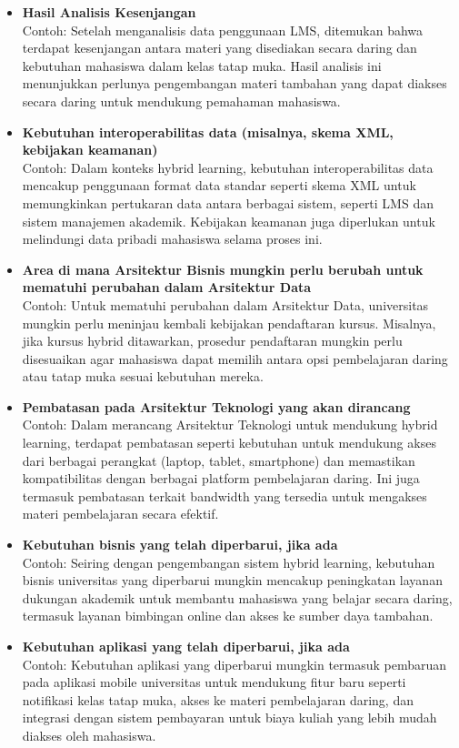 \begin{itemize}
	\item \textbf{Hasil Analisis Kesenjangan} \\
	Contoh: Setelah menganalisis data penggunaan LMS, ditemukan bahwa terdapat kesenjangan antara materi yang disediakan secara daring dan kebutuhan mahasiswa dalam kelas tatap muka. Hasil analisis ini menunjukkan perlunya pengembangan materi tambahan yang dapat diakses secara daring untuk mendukung pemahaman mahasiswa.
	
	\item \textbf{Kebutuhan interoperabilitas data (misalnya, skema XML, kebijakan keamanan)} \\
	Contoh: Dalam konteks hybrid learning, kebutuhan interoperabilitas data mencakup penggunaan format data standar seperti skema XML untuk memungkinkan pertukaran data antara berbagai sistem, seperti LMS dan sistem manajemen akademik. Kebijakan keamanan juga diperlukan untuk melindungi data pribadi mahasiswa selama proses ini.
	
	\item \textbf{Area di mana Arsitektur Bisnis mungkin perlu berubah untuk mematuhi perubahan dalam Arsitektur Data} \\
	Contoh: Untuk mematuhi perubahan dalam Arsitektur Data, universitas mungkin perlu meninjau kembali kebijakan pendaftaran kursus. Misalnya, jika kursus hybrid ditawarkan, prosedur pendaftaran mungkin perlu disesuaikan agar mahasiswa dapat memilih antara opsi pembelajaran daring atau tatap muka sesuai kebutuhan mereka.
	
	\item \textbf{Pembatasan pada Arsitektur Teknologi yang akan dirancang} \\
	Contoh: Dalam merancang Arsitektur Teknologi untuk mendukung hybrid learning, terdapat pembatasan seperti kebutuhan untuk mendukung akses dari berbagai perangkat (laptop, tablet, smartphone) dan memastikan kompatibilitas dengan berbagai platform pembelajaran daring. Ini juga termasuk pembatasan terkait bandwidth yang tersedia untuk mengakses materi pembelajaran secara efektif.
	
	\item \textbf{Kebutuhan bisnis yang telah diperbarui, jika ada} \\
	Contoh: Seiring dengan pengembangan sistem hybrid learning, kebutuhan bisnis universitas yang diperbarui mungkin mencakup peningkatan layanan dukungan akademik untuk membantu mahasiswa yang belajar secara daring, termasuk layanan bimbingan online dan akses ke sumber daya tambahan.
	
	\item \textbf{Kebutuhan aplikasi yang telah diperbarui, jika ada} \\
	Contoh: Kebutuhan aplikasi yang diperbarui mungkin termasuk pembaruan pada aplikasi mobile universitas untuk mendukung fitur baru seperti notifikasi kelas tatap muka, akses ke materi pembelajaran daring, dan integrasi dengan sistem pembayaran untuk biaya kuliah yang lebih mudah diakses oleh mahasiswa.
\end{itemize}

